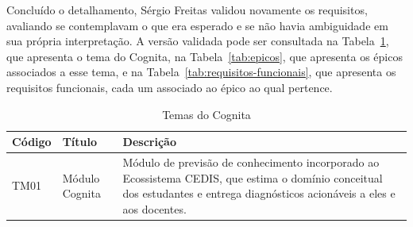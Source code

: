 Concluído o detalhamento, Sérgio Freitas validou novamente os requisitos, avaliando se contemplavam o que era esperado e se não havia ambiguidade em sua própria interpretação. A versão validada pode ser consultada na Tabela~\ref{tab:temas}, que apresenta o tema do Cognita, na Tabela~\ref{tab:epicos}, que apresenta os épicos associados a esse tema, e na Tabela~\ref{tab:requisitos-funcionais}, que apresenta os requisitos funcionais, cada um associado ao épico ao qual pertence.

\begin{table}[H]
\caption{Temas do Cognita}
\label{tab:temas}
\centering
\begin{tabularx}{\textwidth}{l>{\raggedright\arraybackslash}p{3.2cm}>{\raggedright\arraybackslash}X}
\hline
\textbf{Código} & \textbf{Título} & \textbf{Descrição} \\
\hline
TM01 & Módulo Cognita & Módulo de previsão de conhecimento incorporado ao Ecossistema CEDIS, que estima o domínio conceitual dos estudantes e entrega diagnósticos acionáveis a eles e aos docentes. \\
\hline
\end{tabularx}
\end{table}

